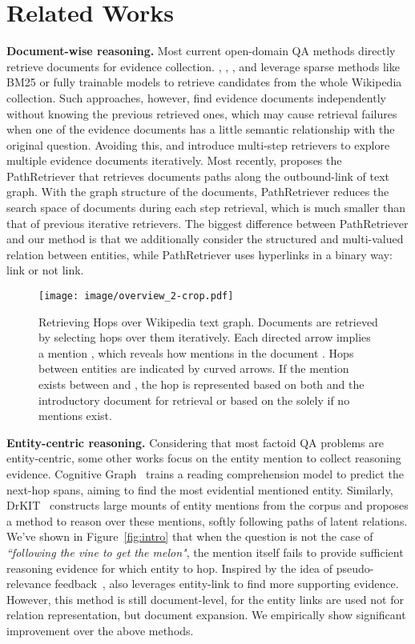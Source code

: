 \documentclass[letterpaper]{article} \usepackage{aaai21}  \usepackage{times}  \usepackage{helvet} \usepackage{courier}  \usepackage[hyphens]{url}  \usepackage{graphicx} \urlstyle{rm} \def\UrlFont{\rm}  \usepackage{graphicx}  \usepackage{natbib}  \usepackage{caption} \frenchspacing  \setlength{\pdfpagewidth}{8.5in}  \setlength{\pdfpageheight}{11in}
\begin{document}
\section{Related Works}
\label{sec:related-works}
\textbf{Document-wise reasoning.}
Most current open-domain QA methods directly retrieve documents for evidence collection. \citet{DRQA}, \citet{ORQA}, \citet{DPR}, and \citet{SemanticMRS} leverage sparse methods like BM25 or fully trainable models to retrieve candidates from the whole Wikipedia collection. Such approaches, however, find evidence documents independently without knowing the previous retrieved ones, which may cause retrieval failures when one of the evidence documents has a little semantic relationship with the original question. Avoiding this, \citet{Multi-Hop-Paragraph-Retrieval} and \citet{Multi-step-Retriever-Reader} introduce multi-step retrievers to explore multiple evidence documents iteratively. Most recently, \citet{asai2019PR} proposes the PathRetriever that retrieves documents paths along the outbound-link of text graph. With the graph structure of the documents, PathRetriever reduces the search space of documents during each step retrieval, which is much smaller than that of previous iterative retrievers. The biggest difference between PathRetriever and our method is that we additionally consider the structured and multi-valued relation between entities, while PathRetriever uses hyperlinks in a binary way: link or not link.

\begin{figure*}[h]
    \centering
    \texttt{[image: image/overview\_2-crop.pdf]}
    \caption{Retrieving Hops over Wikipedia text graph. Documents are retrieved by selecting hops over them iteratively. Each directed arrow implies a mention , which reveals how  mentions  in the document . Hops between entities are indicated by curved arrows. If the mention  exists between  and , the hop  is represented based on both  and the introductory document  for retrieval or based on the  solely if no mentions exist. 
    } 
    \label{fig:overview}
\end{figure*}


\noindent
\textbf{Entity-centric reasoning.}
Considering that most factoid QA problems are entity-centric, some other works focus on the entity mention to collect reasoning evidence. Cognitive Graph~\cite{CogQA} trains a reading comprehension model to predict the next-hop spans, aiming to find the most evidential mentioned entity. Similarly, DrKIT~\cite{DrKIT} constructs large mounts of entity mentions from the corpus and proposes a method to reason over these mentions, softly following paths of latent relations. We've shown in Figure~\ref{fig:intro} that when the question is not the case of \textit{``following the vine to get the melon"}, the mention itself fails to provide sufficient reasoning evidence for which entity to hop. Inspired by the idea of pseudo-relevance feedback~\cite{prf}, \citet{Multi-step-Entity-centric} also leverages entity-link to find more supporting evidence. However, this method is still document-level, for the entity links are used not for relation representation, but document expansion. We empirically show significant improvement over the above methods. 
\end{document}
